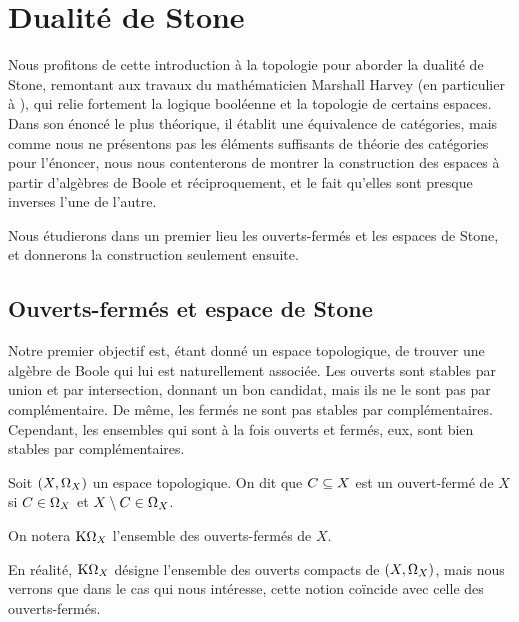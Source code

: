 \section{Dualité de Stone}

Nous profitons de cette introduction à la topologie pour aborder la dualité de
Stone, remontant aux travaux du mathématicien Marshall Harvey 
(en particulier à \cite{Stone1936}), qui relie fortement la logique booléenne
et la topologie de certains espaces. Dans son énoncé le plus théorique, il
établit une équivalence de catégories, mais comme nous ne présentons pas les
éléments suffisants de théorie des catégories pour l'énoncer, nous nous
contenterons de montrer la construction des espaces à partir d'algèbres de Boole
et réciproquement, et le fait qu'elles sont presque inverses l'une de l'autre.

Nous étudierons dans un premier lieu les ouverts-fermés et les espaces de Stone,
et donnerons la construction seulement ensuite.

\subsection{Ouverts-fermés et espace de Stone}

Notre premier objectif est, étant donné un espace topologique, de trouver une
algèbre de Boole qui lui est naturellement associée. Les ouverts sont stables
par union et par intersection, donnant un bon candidat, mais ils ne le sont pas
par complémentaire. De même, les fermés ne sont pas stables par complémentaires.
Cependant, les ensembles qui sont à la fois ouverts et fermés, eux, sont bien
stables par complémentaires.

\begin{definition}
  Soit $(X,\Omega_{X})$ un espace topologique. On dit que
  $C\subseteq X$ est un ouvert-fermé de $X$ si
  $C\in \Omega_{X}$ et $X\setminus C \in \Omega_{X}$.

  On notera $\mathrm{K}\Omega_{X}$ l'ensemble des ouverts-fermés de $X$.
\end{definition}

\begin{remark}
  En réalité, $\mathrm{K}\Omega_{X}$ désigne l'ensemble des ouverts compacts de
  $(X,\Omega_{X})$, mais nous verrons que dans le cas qui nous intéresse, cette
  notion coïncide avec celle des ouverts-fermés.
\end{remark}

